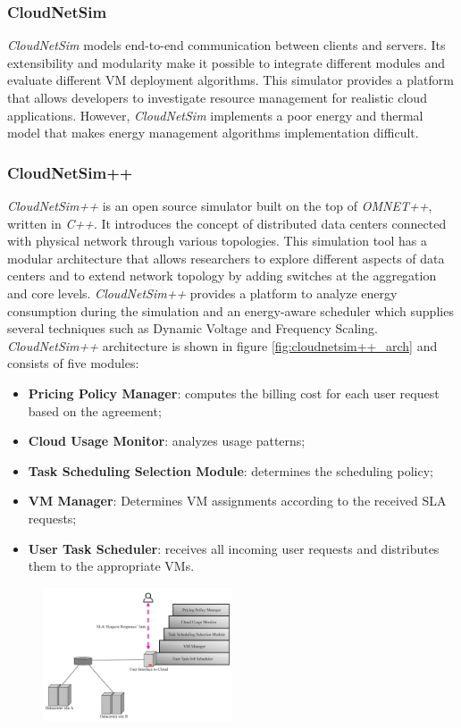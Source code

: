 {\subsubsection*{CloudNetSim}
\emph{CloudNetSim} \cite{cucinotta2013cloudnetsim} models end-to-end communication between clients and servers. Its extensibility and modularity make it possible to integrate different modules and evaluate different VM deployment algorithms. This simulator provides a platform that allows developers to investigate resource management for realistic cloud applications. However, \emph{CloudNetSim} implements a poor energy and thermal model that makes energy management algorithms implementation difficult. \cite{mansouri2020cloud}
\subsubsection{CloudNetSim++}
\emph{CloudNetSim++} \cite{malik2014cloudnetsim++} is an open source simulator built on the top of \emph{OMNET++}, written in \emph{C++}. It introduces the concept of distributed data centers connected with physical network through various topologies. This simulation tool has a modular architecture that allows researchers to explore different aspects of data centers and to extend network topology by adding switches at the aggregation and core levels. \emph{CloudNetSim++} provides a platform to analyze energy consumption during the simulation and an energy-aware scheduler which supplies several techniques such as Dynamic Voltage and Frequency Scaling. 
\emph{CloudNetSim++} architecture is shown in figure \ref{fig:cloudnetsim++_arch} and consists of five modules:
\begin{itemize}
    \item \textbf{Pricing Policy Manager}: computes the billing cost for each user request based on the agreement;
    \item \textbf{Cloud Usage Monitor}: analyzes usage patterns;
    \item \textbf{Task Scheduling Selection Module}: determines the scheduling policy;
    \item \textbf{VM Manager}: Determines VM assignments according to the received SLA requests;
    \item \textbf{User Task Scheduler}: receives all incoming user requests and distributes them to the appropriate VMs.
\end{itemize}
\begin{figure}[h]
    \centering
    \includegraphics[width=0.5\textwidth]{chapters/images/cloudnetsim++_arch.png}

\end{figure}}
